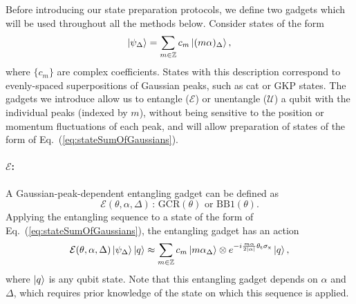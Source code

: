 \documentclass[aps,prx,showpacs,notitlepage,twocolumn,superscriptaddress,nofootinbib,preprintnumbers,floatfix,10pt, longbibliography]{revtex4-2}
\begin{document}
Before introducing our state preparation protocols, we define two gadgets which will be used throughout all the methods below. Consider states of the form
\begin{equation}\label{eq:stateSumOfGaussians}
    \ket{\psi_\Delta} = \sum_{m \in \mathbb  Z} c_m \ket{(m \alpha)_\Delta},
\end{equation}
where $\{c_m\}$ are complex coefficients. States with this description correspond to evenly-spaced superpositions of Gaussian peaks, such as cat or GKP states. The gadgets we introduce allow us to entangle ($\mathcal E$) or unentangle ($\mathcal U$) a qubit with the individual peaks (indexed by $m$), without being sensitive to the position or momentum fluctuations of each peak, and will allow preparation of states of the form of Eq.~(\ref{eq:stateSumOfGaussians}).

\paragraph{$\mathcal{E}$:} A Gaussian-peak-dependent entangling gadget can be defined as 
\begin{equation}
  \mathcal{E}(\theta,\alpha,\Delta)\,:\,\mathrm{GCR}(\theta)  \textrm{ or } \mathrm{BB1}(\theta).
\end{equation}
Applying the entangling sequence to a state of the form of Eq.~(\ref{eq:stateSumOfGaussians}), the entangling gadget has an action
\begin{equation}
    \mathcal E(\theta,\alpha,\Delta)\ket{\psi_\Delta}\ket{q} \approx \sum_{m \in \mathbb  Z} c_m \ket{m \alpha_\Delta}\otimes e^{-i \frac{m\alpha}{2|\alpha|}\theta_\mathrm{t}\sigma_\mathrm{x}}\ket{q},\label{eq:ent}
\end{equation}
where $\ket{q}$ is any qubit state. Note that this entangling gadget depends on $\alpha$ and $\Delta$, which requires prior knowledge of the state on which this sequence is applied.
\end{document}
